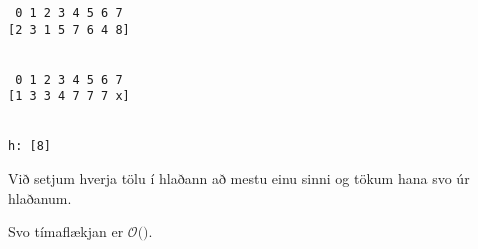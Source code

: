 { \begin{verbatim}
 0 1 2 3 4 5 6 7
[2 3 1 5 7 6 4 8]


 0 1 2 3 4 5 6 7
[1 3 3 4 7 7 7 x]


h: [8]
\end{verbatim} }

{
	\only<all:1>{\ngeAA}
	\only<all:2>{\ngeAB}
	\only<all:3>{\ngeAC}
	\only<all:4>{\ngeAD}
	\only<all:5>{\ngeAE}
	\only<all:6>{\ngeAF}
	\only<all:7>{\ngeAG}
	\only<all:8>{\ngeAH}
	\only<all:9>{\ngeAI}
	\only<all:10>{\ngeAJ}
	\only<all:11>{\ngeAK}
	\only<all:12>{\ngeAL}
	\only<all:13>{\ngeAM}
	\only<all:14>{\ngeAN}
	\only<all:15>{\ngeAO}
	\only<all:16>{\ngeAP}
	\only<all:17>{\ngeAQ}
	\only<all:18>{\ngeAR}
	\only<all:19>{\ngeAS}
	\only<all:20>{\ngeAT}
	\only<all:21>{\ngeAU}
	\only<all:22>{\ngeAV}
	\only<all:23>{\ngeAW}
	\only<all:24>{\ngeAX}
	\only<all:25>{\ngeAY}
	\only<all:26>{\ngeAZ}
	\only<all:27>{\ngeBA}
	\only<all:28>{\ngeBB}
	\only<all:29>{\ngeBC}
	\only<all:30>{\ngeBD}
	\only<all:31>{\ngeBE}
	\only<all:32>{\ngeBF}
	\only<all:33>{\ngeBG}
	\only<all:34>{\ngeBH}
	\only<all:35>{\ngeBI}
	\only<all:36>{\ngeBJ}
	\only<all:37>{\ngeBK}
	\only<all:38>{\ngeBL}
	\only<all:39>{\ngeBM}
	\only<all:40>{\ngeBN}
	\only<all:41>{\ngeBO}
	\only<all:42>{\ngeBP}
}

{
}

{

	{
		\item<1-> Við setjum hverja tölu í hlaðann að mestu einu sinni og tökum hana svo úr hlaðanum.
		\item<2-> Svo tímaflækjan er $\mathcal{O}($\onslide<3->{$\,n\,$}$)$.
	}
}

{
}


